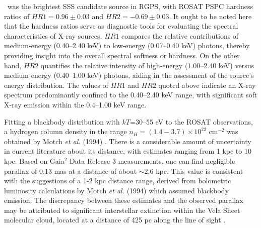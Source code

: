 	\source\ was the brightest SSS candidate source in RGPS, with ROSAT PSPC hardness ratios of $HR1=0.96\pm 0.03$ and $HR2=-0.69\pm 0.03$. It ought to be noted here that the hardness ratios serve as diagnostic tools for evaluating the spectral characteristics of X-ray sources. $HR1$ compares the relative contributions of medium-energy (0.40--2.40 keV) to low-energy (0.07--0.40 keV) photons, thereby providing insight into the overall spectral softness or hardness. On the other hand, $HR2$ quantifies the relative intensity of high-energy (1.00--2.40 keV) versus medium-energy (0.40--1.00 keV) photons, aiding in the assessment of the source's energy distribution. The values of $HR1$ and $HR2$ quoted above indicate an X-ray spectrum predominantly confined to the 0.40--2.40 keV range, with significant soft X-ray emission within the 0.4--1.00 keV range. %
	
	Fitting a blackbody distribution with $kT$=30--55 eV to the ROSAT observations, a hydrogen column density in the range $n_H=(1.4-3.7)\times 10^{22}$ cm$^{-2}$ was obtained by Motch \textit{et al.} (1994) \cite{motch1994}. There is a considerable amount of uncertainty in current literature about its distance, with estimates ranging from 1 kpc to 10 kpc. Based on Gaia$^2$ Data Release 3 measurements, one can find negligible parallax of 0.13 mas at a distance of about $\sim 2.6$ kpc. This value is consistent with the suggestions of a 1-2 kpc distance range, derived from bolometric luminosity calculations by Motch \textit{et al.} (1994) \cite{motch1994} which assumed blackbody emission. The discrepancy between these estimates and the observed parallax may be attributed to significant interstellar extinction within the Vela Sheet molecular cloud, located at a distance of 425 pc along the line of sight \cite{grabelsky1987}. %
	

